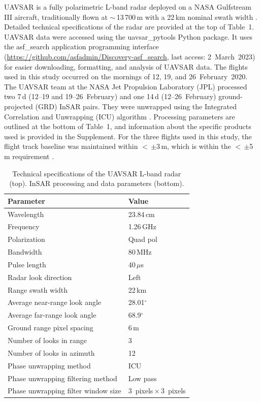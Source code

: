UAVSAR is a fully polarimetric L-band radar deployed on a NASA Gulfstream III aircraft, traditionally flown at $\sim$\,13\,700\,m with a 22\,km nominal swath width \citep{hensleyUAVSARInstrumentDescription2008, rosenUAVSARNewNASA2006}. Detailed technical specifications of the radar are provided at the top of Table~1. UAVSAR data were accessed using the uavsar\_pytools \citep{keskinenUavsarPytools2022} Python package. It uses the asf\_search application programming interface (\url{https://github.com/asfadmin/Discovery-asf_search}, last access: 2~March~2023) for easier downloading, formatting, and analysis of UAVSAR data. The flights used in this study occurred on the mornings of 12, 19, and 26~February~2020. The UAVSAR team at the NASA Jet Propulsion Laboratory (JPL) processed two 7\,d (12--19 and 19--26~February) and one 14\,d (12--26~February) ground-projected (GRD) InSAR pairs. They were unwrapped using the Integrated Correlation and Unwrapping (ICU) algorithm \citep{goldsteinSatelliteRadarInterferometry1988}. Processing parameters are outlined at the bottom of Table~1, and information about the specific products used is provided in the Supplement. For the three flights used in this study, the flight track baseline was maintained within $<$\,$\pm$3\,m, which is within the $<$\,$\pm$5\,m requirement \citep{hensleyUAVSARInstrumentDescription2008}.

\begin{table}[t]
\centering
\caption{Technical specifications of the UAVSAR L-band radar (top). InSAR processing and data parameters (bottom).}
\begin{tabular}{ll}
\toprule Parameter & Value \\
\midrule
Wavelength & 23.84\,cm \\
Frequency & 1.26\,GHz \\
Polarization & Quad pol \\
Bandwidth & 80\,MHz \\
Pulse length & 40\,$\mu$s \\
Radar look direction & Left \\
Range swath width & 22\,km \\
Average near-range look angle & 28.01$^{\circ}$\\
Average far-range look angle & 68.9$^{\circ}$\\
\midrule
Ground range pixel spacing & 6\,m \\
Number of looks in range & 3 \\
Number of looks in azimuth & 12 \\
Phase unwrapping method & ICU \\
Phase unwrapping filtering method & Low pass \\
Phase unwrapping filter window size & 3~pixels\,$\times$\,3~pixels \\
\bottomrule
\end{tabular}
\end{table}

